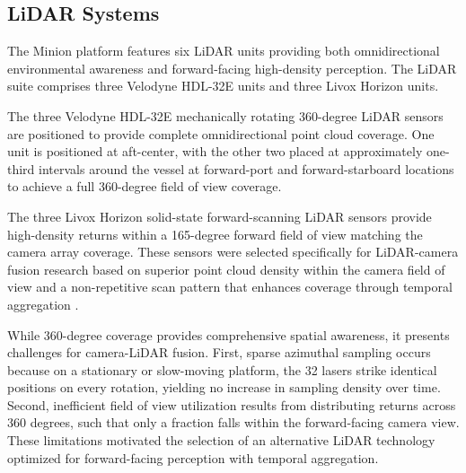 \documentclass{erauthesis}
\begin{document}
        \subsection{LiDAR Systems}

The Minion platform features six \ac{LiDAR} units providing both omnidirectional environmental awareness and forward-facing high-density perception.
The \ac{LiDAR} suite comprises three Velodyne HDL-32E units and three Livox Horizon units.

The three Velodyne HDL-32E mechanically rotating 360-degree \ac{LiDAR} sensors are positioned to provide complete omnidirectional point cloud coverage.
One unit is positioned at aft-center, with the other two placed at approximately one-third intervals around the vessel at forward-port and forward-starboard locations to achieve a full 360-degree field of view coverage.

The three Livox Horizon solid-state forward-scanning \ac{LiDAR} sensors provide high-density returns within a 165-degree forward field of view matching the camera array coverage.
These sensors were selected specifically for \ac{LiDAR}-camera fusion research based on superior point cloud density within the camera field of view and a non-repetitive scan pattern that enhances coverage through temporal aggregation \cite{thompson2023}.


While 360-degree coverage provides comprehensive spatial awareness, it presents challenges for camera-\ac{LiDAR} fusion.
First, sparse azimuthal sampling occurs because on a stationary or slow-moving platform, the 32 lasers strike identical positions on every rotation, yielding no increase in sampling density over time.
Second, inefficient field of view utilization results from distributing returns across 360 degrees, such that only a fraction falls within the forward-facing camera view.
These limitations motivated the selection of an alternative \ac{LiDAR} technology optimized for forward-facing perception with temporal aggregation.
\end{document}

